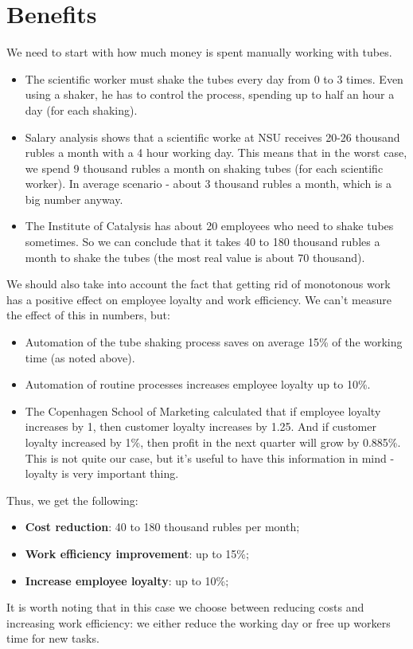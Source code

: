 \section{Benefits}

We need to start with how much money is spent manually working with tubes.

\begin{itemize}
\item The scientific worker must shake the tubes every day from 0 to 3 times. Even using a shaker, he has to control the process, spending up to half an hour a day (for each shaking). 

\item Salary analysis shows that a scientific worke at NSU receives 20-26 thousand rubles a month with a 4 hour working day. This means that in the worst case, we spend 9 thousand rubles a month on shaking tubes (for each scientific worker). In average scenario - about 3 thousand rubles a month, which is a big number anyway.

\item The Institute of Catalysis has about 20 employees who need to shake tubes sometimes. So we can conclude that it takes 40 to 180 thousand rubles a month to shake the tubes (the most real value is about 70 thousand).
\end{itemize}
\newline
We should also take into account the fact that getting rid of monotonous work has a positive effect on employee loyalty and work efficiency. We can't measure the effect of this in numbers, but: 
\begin{itemize}
    \item Automation of the tube shaking process saves on average 15\% of the working time (as noted above).
    \item Automation of routine processes increases employee loyalty up to 10\%.
    \item The Copenhagen School of Marketing calculated that if employee loyalty increases by 1, then customer loyalty increases by 1.25. And if customer loyalty increased by 1\%, then profit in the next quarter will grow by 0.885\%. This is not quite our case, but it’s useful to have this information in mind - loyalty is very important thing.
\end{itemize}
Thus, we get the following:
\begin{itemize}
    \item \textbf{Cost reduction}: 40 to 180 thousand rubles per month;
    \item \textbf{Work efficiency improvement}: up to 15\%;
    \item \textbf{Increase employee loyalty}: up to 10\%;
\end{itemize}
\newline
It is worth noting that in this case we choose between reducing costs and increasing work efficiency: we either reduce the working day or free up workers time for new tasks.


